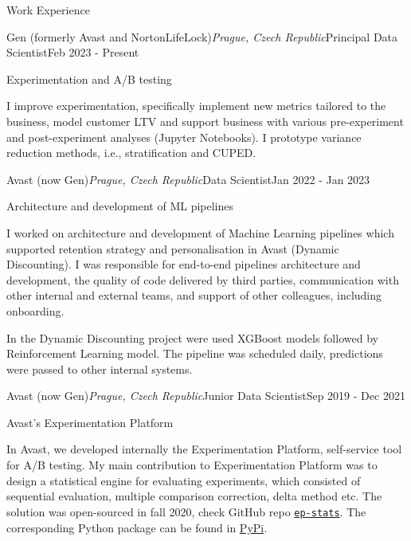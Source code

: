 \documentclass{resume} %
\begin{document}
\begin{rSection}{Work Experience}
 
    \begin{rSubsection}{Gen (formerly Avast and NortonLifeLock)}{\em Prague, Czech Republic}{Principal Data Scientist}{Feb 2023 - Present}
        \item Experimentation and A/B testing
        
        I improve experimentation, specifically implement new metrics tailored to the business, model customer LTV and support business with various pre-experiment and post-experiment analyses (Jupyter Notebooks). I prototype variance reduction methods, i.e., stratification and CUPED.

    \end{rSubsection}

    \begin{rSubsection}{Avast (now Gen)}{\em Prague, Czech Republic}{Data Scientist}{Jan 2022 - Jan 2023}
        \item Architecture and development of ML pipelines
        
        I worked on architecture and development of Machine Learning pipelines which supported retention strategy and personalisation in Avast (Dynamic Discounting). I was responsible for end-to-end pipelines architecture and development, the quality of code delivered by third parties, communication with other internal and external teams, and support of other colleagues, including onboarding.
        
        In the Dynamic Discounting project were used XGBoost models followed by Reinforcement Learning model. The pipeline was scheduled daily, predictions were passed to other internal systems.

    \end{rSubsection}

    \begin{rSubsection}{Avast (now Gen)}{\em Prague, Czech Republic}{Junior Data Scientist}{Sep 2019 - Dec 2021}
        \item Avast's Experimentation Platform
        
        In Avast, we developed internally the Experimentation Platform, self-service tool for A/B testing. My main contribution to Experimentation Platform was to design a statistical engine for evaluating experiments, which consisted of sequential evaluation, multiple comparison correction, delta method etc.
        The solution was open-sourced in fall 2020, check GitHub repo \href{https://github.com/avast/ep-stats}{\texttt{ep-stats}}. The corresponding Python package can be found in \href{https://pypi.org/project/ep-stats/}{PyPi}.
        

\end{rSubsection}
\end{rSection}
\end{document}
